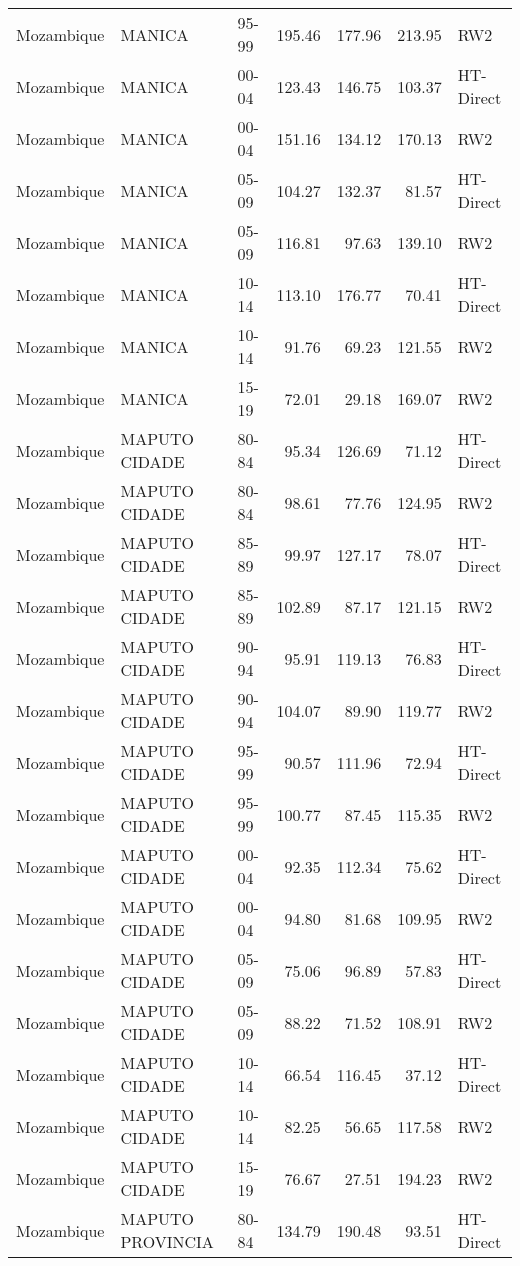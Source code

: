 \begin{longtable}{lllrrrl}
  Mozambique & MANICA & 95-99 & 195.46 & 177.96 & 213.95 & RW2 \\ 
  Mozambique & MANICA & 00-04 & 123.43 & 146.75 & 103.37 & HT-Direct \\ 
  Mozambique & MANICA & 00-04 & 151.16 & 134.12 & 170.13 & RW2 \\ 
  Mozambique & MANICA & 05-09 & 104.27 & 132.37 & 81.57 & HT-Direct \\ 
  Mozambique & MANICA & 05-09 & 116.81 & 97.63 & 139.10 & RW2 \\ 
  Mozambique & MANICA & 10-14 & 113.10 & 176.77 & 70.41 & HT-Direct \\ 
  Mozambique & MANICA & 10-14 & 91.76 & 69.23 & 121.55 & RW2 \\ 
  Mozambique & MANICA & 15-19 & 72.01 & 29.18 & 169.07 & RW2 \\ 
  Mozambique & MAPUTO CIDADE & 80-84 & 95.34 & 126.69 & 71.12 & HT-Direct \\ 
  Mozambique & MAPUTO CIDADE & 80-84 & 98.61 & 77.76 & 124.95 & RW2 \\ 
  Mozambique & MAPUTO CIDADE & 85-89 & 99.97 & 127.17 & 78.07 & HT-Direct \\ 
  Mozambique & MAPUTO CIDADE & 85-89 & 102.89 & 87.17 & 121.15 & RW2 \\ 
  Mozambique & MAPUTO CIDADE & 90-94 & 95.91 & 119.13 & 76.83 & HT-Direct \\ 
  Mozambique & MAPUTO CIDADE & 90-94 & 104.07 & 89.90 & 119.77 & RW2 \\ 
  Mozambique & MAPUTO CIDADE & 95-99 & 90.57 & 111.96 & 72.94 & HT-Direct \\ 
  Mozambique & MAPUTO CIDADE & 95-99 & 100.77 & 87.45 & 115.35 & RW2 \\ 
  Mozambique & MAPUTO CIDADE & 00-04 & 92.35 & 112.34 & 75.62 & HT-Direct \\ 
  Mozambique & MAPUTO CIDADE & 00-04 & 94.80 & 81.68 & 109.95 & RW2 \\ 
  Mozambique & MAPUTO CIDADE & 05-09 & 75.06 & 96.89 & 57.83 & HT-Direct \\ 
  Mozambique & MAPUTO CIDADE & 05-09 & 88.22 & 71.52 & 108.91 & RW2 \\ 
  Mozambique & MAPUTO CIDADE & 10-14 & 66.54 & 116.45 & 37.12 & HT-Direct \\ 
  Mozambique & MAPUTO CIDADE & 10-14 & 82.25 & 56.65 & 117.58 & RW2 \\ 
  Mozambique & MAPUTO CIDADE & 15-19 & 76.67 & 27.51 & 194.23 & RW2 \\ 
  Mozambique & MAPUTO PROVINCIA & 80-84 & 134.79 & 190.48 & 93.51 & HT-Direct \\ 

\end{longtable}
